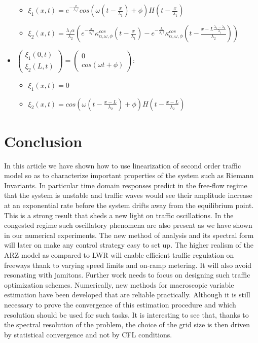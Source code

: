 \documentclass[preprint]{elsarticle}
\begin{document}
\begin{itemize}
\begin{itemize}
\item $\xi_{1}\left(x,t\right)=e^{-\frac{x}{\lambda_{1}\tau}}cos\left(\omega\left(t-\frac{x}{\lambda_{1}}\right)+\phi\right)H\left(t-\frac{x}{\lambda_{1}}\right)$
\item $\xi_{2}\left(x,t\right)=\frac{\lambda_{1}\alpha}{\lambda_{2}}\left(e^{-\frac{x}{\lambda_{1}\tau}}\kappa_{\alpha,\omega,\phi}^{cos}\left(t-\frac{x}{\lambda_{1}}\right)-e^{-\frac{L}{\lambda_{1}\tau}}\kappa_{\alpha,\omega,\phi}^{cos}\left(t-\frac{x-L\frac{\lambda_{1}-\lambda_{2}}{\lambda_{1}}}{\lambda_{2}}\right)\right)$
\end{itemize}
\item $\left(\begin{array}{c}
\xi_{1}\left(0,t\right)\\
\xi_{2}\left(L,t\right)
\end{array}\right)=\left(\begin{array}{c}
0\\
cos\left(\omega t+\phi\right)
\end{array}\right)$:

\begin{itemize}
\item $\xi_{1}\left(x,t\right)=0$
\item $\xi_{2}\left(x,t\right)=cos\left(\omega\left(t-\frac{x-L}{\lambda_{2}}\right)+\phi\right)H\left(t-\frac{x-L}{\lambda_{2}}\right)$\end{itemize}
\end{itemize}

\section{Conclusion}
In this article we have shown how to use linearization of second order traffic model so as to characterize important properties of the system such as Riemann Invariants. In particular time domain responses predict in the free-flow regime that the system is unstable and traffic waves would see their amplitude increase at an exponential rate before the system drifts away from the equilibrium point. This is a strong result that sheds a new light on traffic oscillations. In the congested regime such oscillatory phenomena are also present as we have shown in our numerical experiments. The new method of analysis and its spectral form will later on make any control strategy easy to set up. The higher realism of the ARZ model as compared to LWR will enable efficient traffic regulation on freeways thank to varying speed limits and on-ramp metering. It will also avoid resonating with jamitons. Further work needs to focus on designing such traffic optimization schemes. Numerically, new methods for macroscopic variable estimation have been developed that are reliable practically. Although it is still necessary to prove the convergence of this estimation procedure and which resolution should be used for such tasks. It is interesting to see that, thanks to the spectral resolution of the problem, the choice of the grid size is then driven by statistical convergence and not by CFL conditions.
\end{document}
